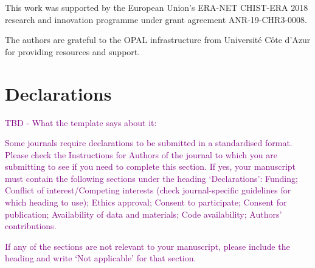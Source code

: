 \documentclass[default]{sn-jnl}%
\theoremstyle{thmstyleone}%
\theoremstyle{thmstyletwo}%
\theoremstyle{thmstylethree}%
\begin{document}
\backmatter


This work was supported by the European Union’s ERA-NET CHIST-ERA 2018 research and innovation programme under grant agreement ANR-19-CHR3-0008.

The authors are grateful to the OPAL infrastructure from Université Côte d'Azur for providing resources and support.

\section*{Declarations}

\textcolor{purple}{TBD - What the template says about it:}

\textcolor{purple}{Some journals require declarations to be submitted in a standardised format. Please check the Instructions for Authors of the journal to which you are submitting to see if you need to complete this section. If yes, your manuscript must contain the following sections under the heading `Declarations': Funding; Conflict of interest/Competing interests (check journal-specific guidelines for which heading to use); Ethics approval; Consent to participate; Consent for publication; Availability of data and materials; Code availability; Authors' contributions. }

\textcolor{purple}{If any of the sections are not relevant to your manuscript, please include the heading and write `Not applicable' for that section. }




\end{document}
